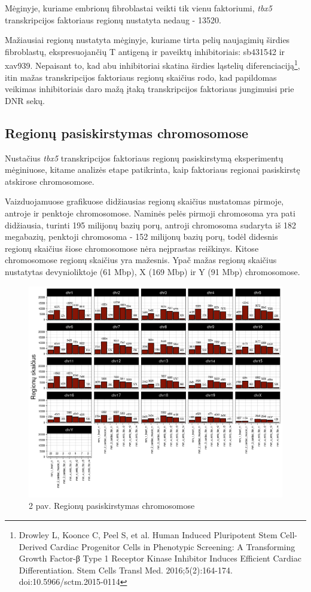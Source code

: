 \documentclass[12pt]{article}
\begin{document}
Mėginyje, kuriame embrionų fibroblastai veikti tik vienu faktoriumi,
\emph{tbx5} transkripcijos faktoriaus regionų nustatyta nedaug -
13520.

Mažiausiai regionų nustatyta mėginyje, kuriame tirta pelių
naujagimių širdies fibroblastų, ekspresuojančių T antigeną
ir paveiktų inhibitoriais: sb431542 ir xav939.
Nepaisant to, kad abu inhibitoriai skatina širdies ląstelių
diferenciaciją\footnote{Drowley L, Koonce C, Peel S, et al.
Human Induced Pluripotent Stem Cell-Derived Cardiac Progenitor
Cells in Phenotypic Screening: A Transforming Growth Factor-β
Type 1 Receptor Kinase Inhibitor Induces Efficient Cardiac
Differentiation. Stem Cells Transl Med. 2016;5(2):164-174.
doi:10.5966/sctm.2015-0114}, itin mažas transkripcijos
faktoriaus regionų skaičius rodo, kad papildomas veikimas
inhibitoriais daro mažą įtaką transkripcijos faktoriaus
jungimuisi prie DNR sekų.

\newpage

\subsection{Regionų pasiskirstymas chromosomose}
Nustačius \emph{tbx5} transkripcijos faktoriaus regionų
pasiskirstymą eksperimentų mėginiuose, kitame analizės etape
patikrinta, kaip faktoriaus regionai pasiskirstę atskirose
chromosomose.

Vaizduojamuose grafikuose didžiausias regionų skaičius nustatomas
pirmoje, antroje ir penktoje chromosomose. Naminės pelės pirmoji
chromosoma yra pati didžiausia, turinti 195 milijonų bazių porų,
antroji chromosoma sudaryta iš 182 megabazių, penktoji chromosoma -
152 milijonų bazių porų, todėl didesnis regionų skaičius šiose
chromosomose nėra neįprastas reiškinys. Kitose chromosomose regionų
skaičius yra mažesnis. Ypač mažas regionų skaičius nustatytas
devynioliktoje (61 Mbp), X (169 Mbp) ir Y (91 Mbp) chromosomose.

\begin{figure}[htb]
    \begin{center}
        \includegraphics[width=0.8\linewidth]{Figures/peak_counts_by_chromosome.png}
        \caption*{2 pav. Regionų pasiskirstymas chromosomose}
    \end{center}
\end{figure}
\end{document}
